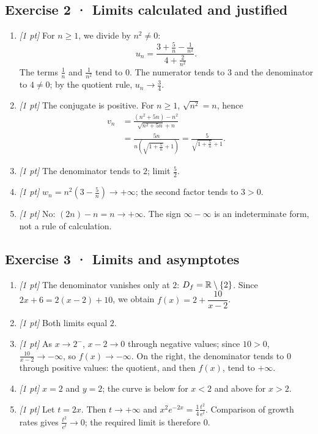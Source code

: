 \subsection*{Exercise 2 · Limits calculated and justified}\begin{enumerate}

\item \textit{[1 pt]} For $n\ge1$, we divide by $n^2\ne0$:
\[u_n=\frac{3+\frac{5}{n}-\frac{1}{n^2}}{4+\frac{2}{n^2}}.\]
The terms $\frac{1}{n}$ and $\frac{1}{n^2}$ tend to $0$. The numerator tends to $3$ and the denominator to $4\ne0$; by the quotient rule, $u_n\to\frac{3}{4}$.

\item \textit{[1 pt]} The conjugate is positive. For $n\ge1$, $\sqrt{n^2}=n$, hence
\[\begin{aligned}v_n&=\frac{(n^2+5n)-n^2}{\sqrt{n^2+5n}+n}\\&=\frac{5n}{n(\sqrt{1+\frac{5}{n}}+1)}=\frac{5}{\sqrt{1+\frac{5}{n}}+1}.\end{aligned}\]

\item \textit{[1 pt]} The denominator tends to $2$; limit $\frac{5}{2}$.

\item \textit{[1 pt]} $w_n=n^2(3-\frac{5}{n})\to+\infty$; the second factor tends to $3>0$.

\item \textit{[1 pt]} No: $(2n)-n=n\to+\infty$. The sign $\infty-\infty$ is an indeterminate form, not a rule of calculation.

\end{enumerate}

\subsection*{Exercise 3 · Limits and asymptotes}\begin{enumerate}

\item \textit{[1 pt]} The denominator vanishes only at $2$: $D_f=\mathbb R\setminus\{2\}$. Since $2x+6=2(x-2)+10$, we obtain $f(x)=2+\dfrac{10}{x-2}$.

\item \textit{[1 pt]} Both limits equal $2$.

\item \textit{[1 pt]} As $x\to 2^-$, $x-2\to0$ through negative values; since $10>0$, $\frac{10}{x-2}\to-\infty$, so $f(x)\to-\infty$. On the right, the denominator tends to $0$ through positive values: the quotient, and then $f(x)$, tend to $+\infty$.

\item \textit{[1 pt]} $x=2$ and $y=2$; the curve is below for $x<2$ and above for $x>2$.

\item \textit{[1 pt]} Let $t=2x$. Then $t\to+\infty$ and $x^2e^{-2x}=\frac{1}{4}\frac{t^2}{e^t}$. Comparison of growth rates gives $\frac{t^2}{e^t}\to0$; the required limit is therefore $0$.

\end{enumerate}

